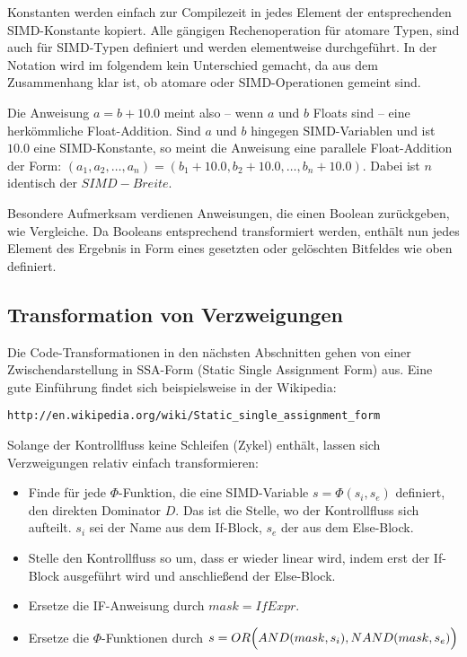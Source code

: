 \documentclass[a4paper,10pt]{article}
\begin{document}
Konstanten werden einfach zur Compilezeit in jedes Element der entsprechenden SIMD-Konstante
kopiert. Alle gängigen Rechenoperation für atomare Typen, sind auch für SIMD-Typen definiert
und werden elementweise durchgeführt. In der Notation wird im folgendem kein Unterschied gemacht, 
da aus dem Zusammenhang klar ist, ob atomare oder SIMD-Operationen gemeint sind.

Die Anweisung $a = b + 10.0$ meint also -- wenn $a$ und $b$ Floats sind -- eine herkömmliche
Float-Addition. Sind $a$ und $b$ hingegen SIMD-Variablen und ist $10.0$ eine SIMD-Konstante, so
meint die Anweisung eine parallele Float-Addition der Form: $(a_1, a_2, \dots, a_n) = (b_1 + 10.0,
b_2 + 10.0, \dots, b_n + 10.0)$. Dabei ist $n$ identisch der $SIMD-Breite$.

Besondere Aufmerksam verdienen Anweisungen, die einen Boolean zurückgeben, wie Vergleiche. Da Booleans
entsprechend transformiert werden, enthält nun jedes Element des Ergebnis in Form eines gesetzten
oder gelöschten Bitfeldes wie oben definiert.

\subsection{Transformation von Verzweigungen}

Die Code-Transformationen in den nächsten Abschnitten gehen von einer Zwischendarstellung in
SSA-Form (Static Single Assignment Form) aus. Eine gute Einführung findet sich beispielsweise in der
Wikipedia: 

\texttt{http://en.wikipedia.org/wiki/Static\_single\_assignment\_form}

Solange der Kontrollfluss keine Schleifen (Zykel) enthält, lassen sich Verzweigungen 
relativ einfach transformieren:

\begin{itemize}

    \item Finde für jede $\Phi$-Funktion, die eine SIMD-Variable $s = \Phi(s_i, s_e)$ definiert, den
    direkten Dominator $D$. Das ist die Stelle, wo der Kontrollfluss sich aufteilt. $s_i$ sei der
    Name aus dem If-Block, $s_e$ der aus dem Else-Block.

    \item Stelle den Kontrollfluss so um, dass er wieder linear wird, indem erst der If-Block ausgeführt wird
    und anschließend der Else-Block. 
    
    \item Ersetze die IF-Anweisung durch $mask = IfExpr$.

    \item Ersetze die $\Phi$-Funktionen durch $s = OR\Bigl( AND(mask, s_i), NAND(mask, s_e)\Bigr)$

\end{itemize}
\end{document}
